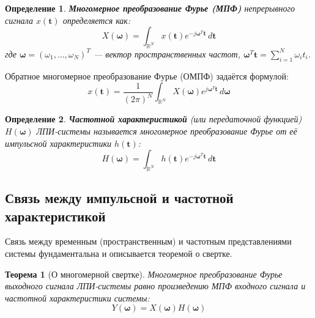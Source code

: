 \documentclass[12pt,a4paper]{article}
\newtheorem{theorem}{Теорема}
\newtheorem{definition}{Определение}
\newcommand{\vect}[1]{\mathbf{#1}}
\begin{document}
\begin{definition}
\textbf{Многомерное преобразование Фурье (МПФ)} непрерывного сигнала $x(\vect{t})$ определяется как:
\begin{equation}
X(\vect{\omega}) = \int_{\mathbb{R}^N} x(\vect{t}) e^{-j \vect{\omega}^T \vect{t}} \, d\vect{t}
\end{equation}
где $\vect{\omega} = (\omega_1, \dots, \omega_N)^T$ — вектор пространственных частот, $\vect{\omega}^T \vect{t} = \sum_{i=1}^N \omega_i t_i$.
\end{definition}

Обратное многомерное преобразование Фурье (ОМПФ) задаётся формулой:
\begin{equation}
x(\vect{t}) = \frac{1}{(2\pi)^N} \int_{\mathbb{R}^N} X(\vect{\omega}) e^{j \vect{\omega}^T \vect{t}} \, d\vect{\omega}
\end{equation}

\begin{definition}
\textbf{Частотной характеристикой} (или передаточной функцией) $H(\vect{\omega})$ ЛПИ-системы называется многомерное преобразование Фурье от её импульсной характеристики $h(\vect{t})$:
\begin{equation}
H(\vect{\omega}) = \int_{\mathbb{R}^N} h(\vect{t}) e^{-j \vect{\omega}^T \vect{t}} \, d\vect{t}
\end{equation}
\end{definition}

\subsection{Связь между импульсной и частотной характеристикой}

Связь между временным (пространственным) и частотным представлениями системы фундаментальна и описывается теоремой о свертке.

\begin{theorem}[О многомерной свертке]
Многомерное преобразование Фурье выходного сигнала ЛПИ-системы равно произведению МПФ входного сигнала и частотной характеристики системы:
$$ Y(\vect{\omega}) = X(\vect{\omega}) H(\vect{\omega}) $$
\end{theorem}
\end{document}
